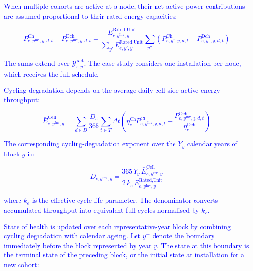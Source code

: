 \documentclass[preprint,12pt]{elsarticle}
\begin{document}
\textcolor{blue}{
    When multiple cohorts are active at a node, their net active-power contributions are assumed proportional to their rated energy capacities:
}

\textcolor{blue}{
    \begin{equation}
        P^{\text{Ch}}_{e,y^\text{Inv},y,d,t} - P^{\text{Dch}}_{e,y^\text{Inv},y,d,t} =
        \frac{E^{\text{Rated,Unit}}_{e,y^\text{Inv},y}}{\sum_{y'} E^{\text{Rated,Unit}}_{e,y',y}}
        \sum_{y''} \left( P^{\text{Ch}}_{e,y'',y,d,t} - P^{\text{Dch}}_{e,y'',y,d,t} \right)
        \label{eq:cohort_allocation}
    \end{equation}
}

\textcolor{blue}{
    The sums extend over $\mathcal{Y}^{\text{Act}}_{e,y}$. The case study considers one installation per node, which receives the full schedule.
}

\textcolor{blue}{
    Cycling degradation depends on the average daily cell-side active-energy throughput:
}

\textcolor{blue}{
    \begin{equation}
        \bar{E}^{\text{Cell}}_{e,y^\text{Inv},y} =
        \sum_{d \in D} \frac{D_d}{365} \sum_{t \in T} \Delta t
        \left(
            \eta^{\text{Ch}}_e P^{\text{Ch}}_{e,y^\text{Inv},y,d,t}
            +
            \frac{P^{\text{Dch}}_{e,y^\text{Inv},y,d,t}}{\eta^{\text{Dch}}_e}
        \right)
        \label{eq:cell_throughput}
    \end{equation}
}

\textcolor{blue}{
    The corresponding cycling-degradation exponent over the $Y_y$ calendar years of block $y$ is:
}

\textcolor{blue}{
    \begin{equation}
        D_{e,y^\text{Inv},y} =
        \frac{365 \, Y_y \, \bar{E}^{\text{Cell}}_{e,y^\text{Inv},y}}
             {2 \, k_e \, E^{\text{Rated,Unit}}_{e,y^\text{Inv},y}}
        \label{eq:cycling_loss}
    \end{equation}
}

\noindent
\textcolor{blue}{
    where $k_e$ is the effective cycle-life parameter. The denominator converts accumulated throughput into equivalent full cycles normalised by $k_e$.
}

\textcolor{blue}{
    State of health is updated over each representative-year block by combining cycling degradation with calendar ageing.
    Let $y^{-}$ denote the boundary immediately before the block represented by year $y$. The state at this boundary is the terminal state of the preceding block, or the initial state at installation for a new cohort:
}
\end{document}
